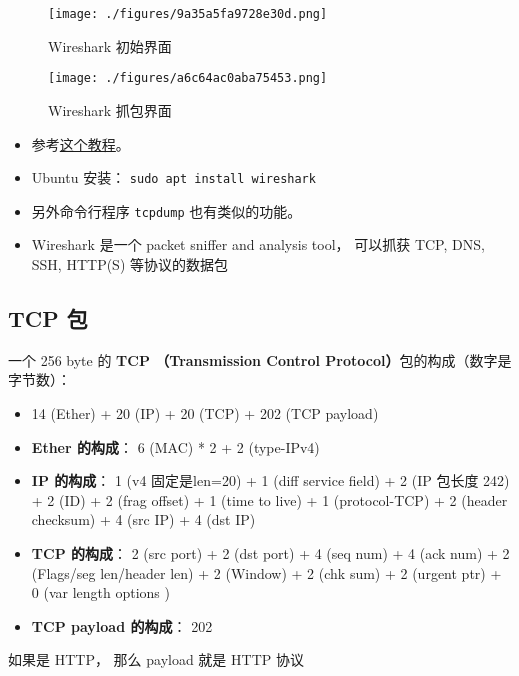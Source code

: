 
\begin{issues}
\issueDraft
\end{issues}

\begin{figure}[ht]
\centering
\texttt{[image: ./figures/9a35a5fa9728e30d.png]}
\caption{Wireshark 初始界面} \label{fig_wiresh_1}
\end{figure}

\begin{figure}[ht]
\centering
\texttt{[image: ./figures/a6c64ac0aba75453.png]}
\caption{Wireshark 抓包界面} \label{fig_wiresh_2}
\end{figure}


\begin{itemize}
\item 参考\href{https://www.varonis.com/blog/how-to-use-wireshark}{这个教程}。
\item Ubuntu 安装： \verb|sudo apt install wireshark|
\item 另外命令行程序 \verb|tcpdump| 也有类似的功能。
\item Wireshark 是一个 packet sniffer and analysis tool， 可以抓获 TCP, DNS, SSH, HTTP(S)   等协议的数据包
\end{itemize}

\subsection{TCP 包}
一个 256 byte 的 \textbf{TCP （Transmission Control Protocol）}包的构成（数字是字节数）：
\begin{itemize}
\item 14 (Ether) + 20 (IP) + 20 (TCP) + 202 (TCP payload)
\item \textbf{Ether 的构成}： 6 (MAC) * 2 + 2 (type-IPv4)
\item \textbf{IP 的构成}： 1 (v4 固定是len=20) + 1 (diff service field) + 2 (IP 包长度 242) + 2 (ID) + 2 (frag offset) + 1 (time to live) + 1 (protocol-TCP) + 2 (header checksum) + 4 (src IP) + 4 (dst IP)
\item \textbf{TCP 的构成}： 2 (src port) + 2 (dst port) + 4 (seq num) + 4 (ack num) + 2 (Flags/seg len/header len) + 2 (Window) + 2 (chk sum) + 2 (urgent ptr) + 0 (var length options )
\item \textbf{TCP payload 的构成}： 202
\end{itemize}

如果是 HTTP， 那么 payload 就是 HTTP 协议

